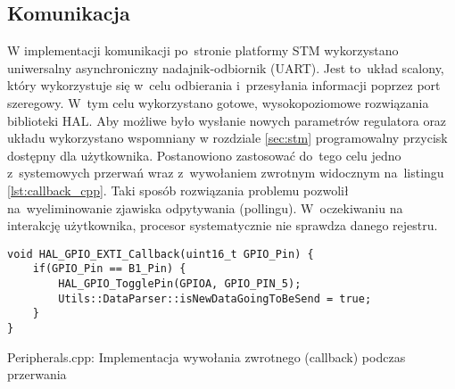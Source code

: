 \subsection{Komunikacja} \label{sec:uart}
W implementacji komunikacji po~stronie platformy STM wykorzystano uniwersalny asynchroniczny
nadajnik-odbiornik (UART). Jest to~układ scalony, który wykorzystuje się w~celu odbierania i~przesyłania
informacji poprzez port szeregowy. W~tym celu wykorzystano gotowe, wysokopoziomowe rozwiązania
biblioteki HAL. Aby możliwe było wysłanie nowych parametrów regulatora oraz układu wykorzystano wspomniany
w rozdziale \ref{sec:stm} programowalny przycisk dostępny dla użytkownika. Postanowiono zastosować do~tego
celu jedno z~systemowych przerwań wraz z~wywołaniem zwrotnym widocznym na~listingu \ref{lst:callback_cpp}.
Taki sposób rozwiązania problemu pozwolił na~wyeliminowanie zjawiska odpytywania (pollingu). W~oczekiwaniu
na interakcję użytkownika, procesor systematycznie nie sprawdza danego rejestru. \cite{forbot}
\begin{listing}[htb]
\begin{verbatim}
void HAL_GPIO_EXTI_Callback(uint16_t GPIO_Pin) {
    if(GPIO_Pin == B1_Pin) {
        HAL_GPIO_TogglePin(GPIOA, GPIO_PIN_5);
        Utils::DataParser::isNewDataGoingToBeSend = true;
    }
}
\end{verbatim}
\caption{Peripherals.cpp: Implementacja wywołania zwrotnego (callback) podczas przerwania}
\label{lst:callback_cpp}
\end{listing}


